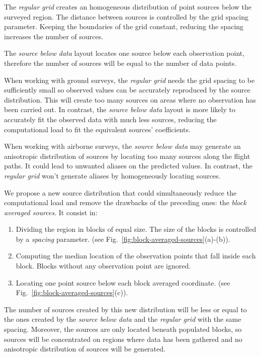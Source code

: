 \documentclass[twocolumn]{article}
\begin{document}
The \emph{regular grid} creates an homogeneous distribution of point sources
below the surveyed region.
The distance between sources is controlled by the grid spacing parameter.
Keeping the boundaries of the grid constant, reducing the spacing increases the
number of sources.

The \emph{source below data} layout locates one source below each
observation point, therefore the number of sources will be equal to the number
of data points.

When working with ground surveys, the \emph{regular grid} needs the grid
spacing to be sufficiently small so observed values can be accurately
reproduced by the source distribution.
This will create too many sources on areas where no observation has been
carried out.
In contrast, the \emph{source below data} layout is more likely to accurately
fit the observed data with much less sources, reducing the computational load
to fit the equivalent sources' coefficients.

When working with airborne surveys, the \emph{source below data} may
generate an anisotropic distribution of sources by locating too many sources
along the flight paths.
It could lead to unwanted aliases on the predicted values.
In contrast, the \emph{regular grid} won't generate aliases by homogeneously
locating sources.

We propose a new source distribution that could simultaneously reduce the
computational load and remove the drawbacks of the preceding ones: the
\emph{block averaged sources}.
It consist in:

\begin{enumerate}
    \item Dividing the region in blocks of equal size. The size of the blocks
        is controlled by a \emph{spacing} parameter.
        (see Fig.~\ref{fig:block-averaged-sources}(a)-(b)).
    \item Computing the median location of the observation points that fall
        inside each block. Blocks without any observation point are ignored.
    \item Locating one point source below each block averaged coordinate.
        (see Fig.~\ref{fig:block-averaged-sources}(c)).
\end{enumerate}

The number of sources created by this new distribution will be less or equal to
the ones created by the \emph{source below data} and the \emph{regular
grid} with the same spacing.
Moreover, the sources are only located beneath populated blocks, so sources
will be concentrated on regions where data has been gathered and no anisotropic
distribution of sources will be generated.
\end{document}
